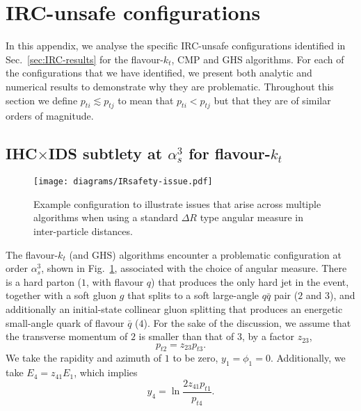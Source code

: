 \documentclass[nofootinbib,twocolumn,preprintnumbers,superscriptaddress,aps]{revtex4-2}
\newcommand{\as}{\alpha_s}
\begin{document}
\section{IRC-unsafe configurations}
\label{sec:list-ir-risky}

In this appendix, we analyse the specific IRC-unsafe configurations identified in Sec.~\ref{sec:IRC-results} for the flavour-$k_t$, CMP and GHS algorithms.
%
For each of the configurations that we have identified, we present both
analytic and numerical results to demonstrate why they are problematic.
%
Throughout this section we define $p_{ti} \lesssim p_{tj}$ to mean that
$p_{ti} < p_{tj}$ but that they are of similar orders of magnitude.


\subsection{IHC$\times$IDS subtlety at $\as^3$ for flavour-$k_t$}
\label{sec:IRCapp-flavkt}

\begin{figure}
  \centering
  \texttt{[image: diagrams/IRsafety-issue.pdf]}
  \caption{Example configuration to illustrate issues that arise
    across multiple algorithms when using a standard
    $\Delta R$ type angular measure in inter-particle distances.
  }
  \label{fig:IRsafety-as3-IHC-DS-diagram}
\end{figure}


The flavour-$k_t$ (and GHS) algorithms encounter a problematic configuration at order $\as^3$, shown in Fig.~\ref{fig:IRsafety-as3-IHC-DS-diagram}, associated with the choice of angular measure.
%
There is a hard parton ($1$, with flavour $q$) that produces the
only hard jet in the event, together with a soft gluon $g$ that
splits to a soft large-angle $q \bar q$ pair ($2$ and $3$), and
additionally an initial-state collinear gluon splitting that produces
an energetic small-angle quark of flavour $\bar q$ ($4$).
%
For the sake of the discussion, we assume that the transverse momentum of $2$ is
smaller than that of $3$, by a factor $z_{23}$,
\begin{equation}
  \label{eq:flavkt-pt2-pt3}
  p_{t2} = z_{23} p_{t3}.
\end{equation}
%
We take the rapidity and azimuth of $1$ to be zero,
$y_1 = \phi_1 = 0$.
%
Additionally, we take $E_4 = z_{41} E_1$, which implies
\begin{equation}
  y_4 = \ln \frac{2z_{41} p_{t1}}{p_{t4}}.
\end{equation}
\end{document}
